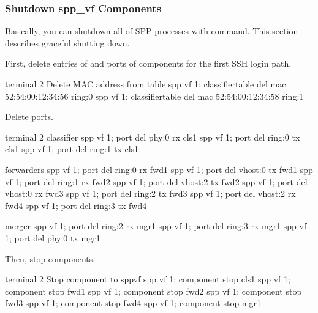 \documentclass[a4paper,11pt,openany,oneside,english]{sphinxmanual}
\begin{document}
\subsubsection{Shutdown spp\_vf Components}
\label{\detokenize{usecases/spp_vf:spp-usecases-vf-ssh-shutdown}}\label{\detokenize{usecases/spp_vf:id3}}
Basically, you can shutdown all of SPP processes with 
command.
This section describes graceful shutting down.

First, delete entries of  and ports of components
for the first SSH login path.

\begin{sphinxVerbatim}[commandchars=\\\{\},formatcom=\footnotesize]
\PYGZsh{} terminal 2
\PYGZsh{} Delete MAC address from table
spp \PYGZgt{} vf 1; classifier\PYGZus{}table del mac 52:54:00:12:34:56 ring:0
spp \PYGZgt{} vf 1; classifier\PYGZus{}table del mac 52:54:00:12:34:58 ring:1
\end{sphinxVerbatim}

Delete ports.

\begin{sphinxVerbatim}[commandchars=\\\{\},formatcom=\footnotesize]
\PYGZsh{} terminal 2
\PYGZsh{} classifier
spp \PYGZgt{} vf 1; port del phy:0 rx cls1
spp \PYGZgt{} vf 1; port del ring:0 tx cls1
spp \PYGZgt{} vf 1; port del ring:1 tx cls1

\PYGZsh{} forwarders
spp \PYGZgt{} vf 1; port del ring:0 rx fwd1
spp \PYGZgt{} vf 1; port del vhost:0 tx fwd1
spp \PYGZgt{} vf 1; port del ring:1 rx fwd2
spp \PYGZgt{} vf 1; port del vhost:2 tx fwd2
spp \PYGZgt{} vf 1; port del vhost:0 rx fwd3
spp \PYGZgt{} vf 1; port del ring:2 tx fwd3
spp \PYGZgt{} vf 1; port del vhost:2 rx fwd4
spp \PYGZgt{} vf 1; port del ring:3 tx fwd4

\PYGZsh{} merger
spp \PYGZgt{} vf 1; port del ring:2 rx mgr1
spp \PYGZgt{} vf 1; port del ring:3 rx mgr1
spp \PYGZgt{} vf 1; port del phy:0 tx mgr1
\end{sphinxVerbatim}

Then, stop components.

\begin{sphinxVerbatim}[commandchars=\\\{\},formatcom=\footnotesize]
\PYGZsh{} terminal 2
\PYGZsh{} Stop component to spp\PYGZus{}vf
spp \PYGZgt{} vf 1; component stop cls1
spp \PYGZgt{} vf 1; component stop fwd1
spp \PYGZgt{} vf 1; component stop fwd2
spp \PYGZgt{} vf 1; component stop fwd3
spp \PYGZgt{} vf 1; component stop fwd4
spp \PYGZgt{} vf 1; component stop mgr1
\end{sphinxVerbatim}
\end{document}
